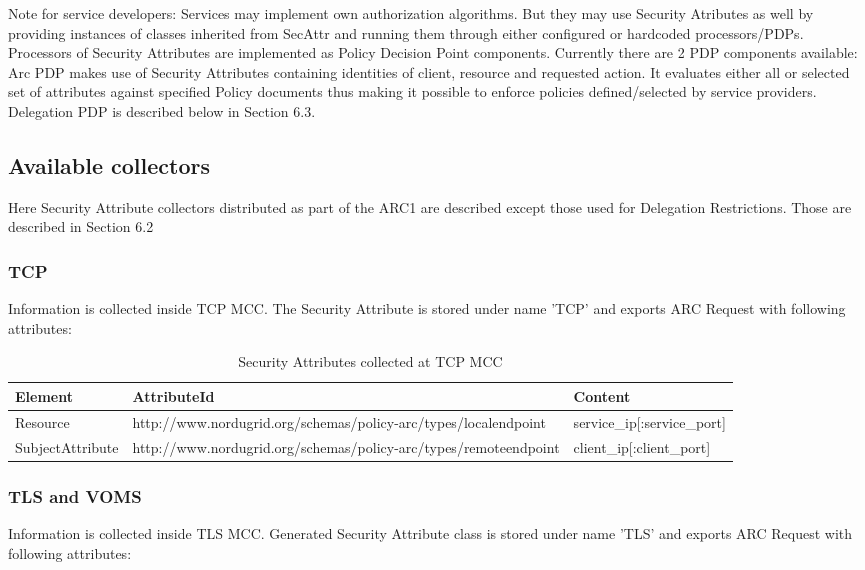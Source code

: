 \documentclass{article}                            %
\begin{document}
Note for service developers: Services may implement own authorization algorithms. But they may use Security Atributes as well by providing instances of classes inherited from SecAttr and running them through either configured or hardcoded processors/PDPs.
Processors of Security Attributes are implemented as Policy Decision Point components. Currently there are 2 PDP components available:
Arc PDP makes use of Security Attributes containing identities of client, resource and requested action. It evaluates either all or selected set of attributes against specified Policy documents thus making it possible to enforce policies defined/selected by service providers. 
Delegation PDP is described below in Section 6.3.


\subsection{Available collectors} %
\label{subsec:sec_attr_avail_collectors}

Here Security Attribute collectors distributed as part of the ARC1 are described except those used for Delegation Restrictions. Those are described in Section 6.2

\subsubsection{TCP} %
\label{subsubsec:sec_attr_TCP}
Information is collected inside TCP MCC. The Security Attribute is stored under name 'TCP' and exports ARC Request with following attributes:

\begin{table}[ht]
\caption{Security Attributes collected at TCP MCC}
\centering
\begin{tabular}{| l | p{7cm} | p{5cm} |}
\hline
\textbf{Element} & \textbf{AttributeId} & \textbf{Content} \\ \hline
Resource & http://www.nordugrid.org/schemas/policy-arc/types/localendpoint & service\_ip[:service\_port] \\ \hline
SubjectAttribute & http://www.nordugrid.org/schemas/policy-arc/types/remoteendpoint & client\_ip[:client\_port] \\ \hline
\end{tabular}
\label{table:tcp_attr}
\end{table}


\subsubsection{TLS and VOMS} %
\label{subsubsec:sec_attr_TLS_VOMS}
Information is collected inside TLS MCC. Generated Security Attribute class is stored under name 'TLS' and exports ARC Request with following attributes:
\end{document}
